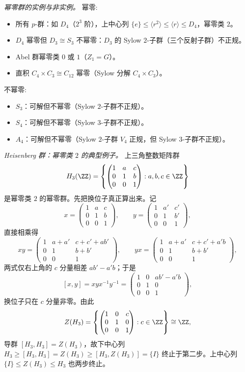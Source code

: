 \medskip
\noindent\emph{幂零群的实例与非实例。}
幂零:
\begin{itemize}
\item 所有 $p$-群：如 $D_4$（$2^3$ 阶），上中心列 $\{e\}\le\langle r^2\rangle\le\langle r\rangle\le D_4$，幂零类 $2$。
\item $D_4$ 幂零但 $D_3\cong S_3$ 不幂零：$D_3$ 的 Sylow $2$-子群（三个反射子群）不正规。
\item Abel 群幂零类 $0$ 或 $1$（$Z_1=G$）。
\item 直积 $C_4\times C_3\cong C_{12}$ 幂零（Sylow 分解 $C_4\times C_3$）。
\end{itemize}
不幂零:
\begin{itemize}
\item $S_3$：可解但不幂零（Sylow $2$-子群不正规）。
\item $S_4$：可解但不幂零（Sylow $3$-子群不正规）。
\item $A_4$：可解但不幂零（Sylow $2$-子群 $V_4$ 正规，但 Sylow $3$-子群不正规）。
\end{itemize}
\par\medskip

\medskip
\noindent\emph{Heisenberg 群：幂零类 $2$ 的典型例子。}
上三角整数矩阵群
\[
H_3(\ZZ)=\left\{\begin{pmatrix}1&a&c\\0&1&b\\0&0&1\end{pmatrix}:a,b,c\in\ZZ\right\}
\]
是幂零类 $2$ 的幂零群。先把换位子真正算出来。记
\[
x=\begin{pmatrix}1&a&c\\0&1&b\\0&0&1\end{pmatrix},
\qquad
y=\begin{pmatrix}1&a'&c'\\0&1&b'\\0&0&1\end{pmatrix},
\]
直接相乘得
\[
xy=\begin{pmatrix}1&a+a'&c+c'+ab'\\0&1&b+b'\\0&0&1\end{pmatrix},
\qquad
yx=\begin{pmatrix}1&a+a'&c+c'+a'b\\0&1&b+b'\\0&0&1\end{pmatrix},
\]
两式仅右上角的 $c$ 分量相差 $ab'-a'b$；于是
\[
[x,y]=xyx^{-1}y^{-1}
=\begin{pmatrix}1&0&ab'-a'b\\0&1&0\\0&0&1\end{pmatrix},
\]
换位子只在 $c$ 分量非零。由此
\[
Z(H_3)=\left\{\begin{pmatrix}1&0&c\\0&1&0\\0&0&1\end{pmatrix}:c\in\ZZ\right\}\cong\ZZ,
\]
导群 $[H_3,H_3]=Z(H_3)$，故下中心列 $H_3\ge[H_3,H_3]=Z(H_3)\ge[H_3,Z(H_3)]=\{I\}$ 终止于第二步。上中心列 $\{I\}\le Z(H_3)\le H_3$ 也两步终止。

